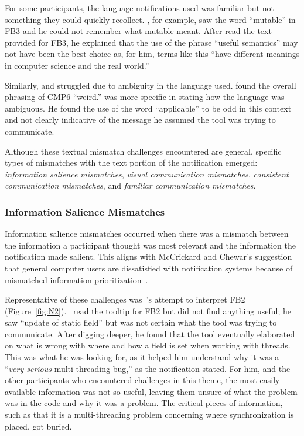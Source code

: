 For some participants, the language notifications used was familiar but not something they could quickly recollect. 
, for example, saw the word ``mutable'' in FB3 and he could not remember what mutable meant.
After  read the text provided for FB3, he explained that the use of the phrase 
``useful semantics'' may not have been the best choice as, for him, terms like this ``have different meanings 
in computer science and the real world.''

Similarly,  and  struggled due to ambiguity in the language used.
 found the overall phrasing of CMP6 ``weird.'' 
 was more specific in stating how the language was ambiguous. 
He found the use of the word ``applicable'' to be odd in this context and not clearly indicative of the message he assumed 
the tool was trying to communicate. 

Although these textual mismatch challenges encountered are general, specific types of mismatches with the text portion of the notification emerged: \textit{information salience mismatches}, \textit{visual communication mismatches}, \textit{consistent communication mismatches}, and \textit{familiar communication mismatches}.

\subsubsection{Information Salience Mismatches}\label{subsec:buried}
Information salience mismatches occurred when there was a mismatch between the information a participant thought was most relevant and the information the notification made salient. 
This aligns with McCrickard and Chewar's suggestion that general computer users are dissatisfied with notification systems because of mismatched information prioritization~\cite{mccrickard2003attuning}.

Representative of these challenges was~'s attempt to interpret FB2 (Figure~\ref{fig:N2}).~ read the tooltip for FB2 but did not find anything useful; he saw ``update of static field'' but was not certain what the tool was trying to communicate. 
After digging deeper, he found that the tool eventually elaborated on what is wrong with where and how a field is set when working with threads. 
This was what he was looking for, as it helped him understand why it was a ``\emph{very serious} multi-threading bug,'' as the notification stated. 
For him, and the other participants who encountered challenges in this theme, the most easily available information was not so useful, leaving them unsure of what the problem was in the code and why it was a problem. 
The critical pieces of information, such as that it is a multi-threading problem concerning where synchronization is placed, got buried.

